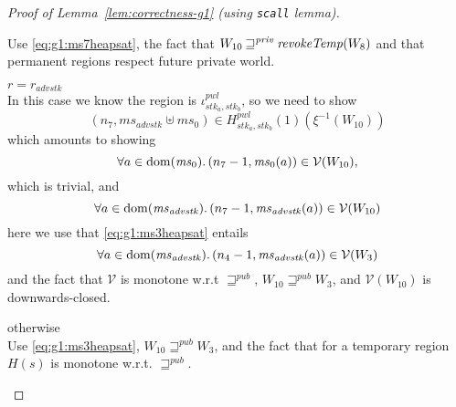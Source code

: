 \documentclass[a4paper]{article}
\DeclareMathOperator{\dom}{dom}
\newcommand{\var}[1]{\mathit{#1}}
\newcommand{\hs}{\var{ms}}
\newcommand{\ms}{\hs}
\newcommand{\adv}{\var{adv}}
\newcommand{\stk}{\var{stk}}
\newcommand{\pwl}{\var{pwl}}
\newcommand{\plainfun}[2]{
  \ifthenelse{\equal{#2}{}}
  {\mathit{#1}}
  {\mathit{#1}(#2)}
}
\newcommand{\revokeTemp}[1]{\plainfun{revokeTemp}{#1}}
\newcommand{\futurewk}{\mathbin{\sqsupseteq}^{\var{pub}}}
\newcommand{\futurestr}{\mathbin{\sqsupseteq}^{\var{priv}}}
\newcommand{\asmType}{\plaindom{AsmType}}
\newcommand{\plaindom}[1]{\mathrm{#1}}
\newcommand{\intr}[2]{\mathcal{#1}}
\newcommand{\valueintr}[1]{\intr{V}{#1}}
\newcommand{\stdvr}{\valueintr{\asmType}}
\newcommand{\npair}[2][n]{\left(#1,#2 \right)}
\begin{document}
\begin{proof}[Proof of Lemma~\ref{lem:correctness-g1} (using \texttt{scall} lemma)]
\begin{enumproof}[resume]
\begin{enumproof}
\begin{enumproof}
\begin{enumproof}
                  Use \ref{eq:g1:ms7heapsat}, the fact that $W_{10} \futurestr \revokeTemp{W_8}$ and that permanent regions respect future private world.
                \item $r = r_{\adv \stk}$ \\
                  In this case we know the region is $\iota^\pwl_{\stk_a,\stk_b}$, so we need to show
                  \[
                    \npair[n_7]{\ms_{\adv \stk} \uplus \ms_0} \in H^\pwl_{\stk_a,\stk_b}(1)(\xi^{-1}(W_{10}))
                  \]
                  which amounts to showing
                  \[
                    \forall a \in \dom(\ms_0) \ldotp  \npair[n_7-1]{\ms_0(a)} \in \stdvr(W_{10}),
                  \]
                  which is trivial, and
                  \[
                    \forall a \in \dom(\ms_{\adv \stk}) \ldotp \npair[n_7-1]{\ms_{\adv \stk}(a)} \in \stdvr(W_{10})
                  \]
                  here we use that \ref{eq:g1:ms3heapsat} entails
                  \[
                    \forall a \in \dom(\ms_{\adv \stk}) \ldotp \npair[n_4-1]{\ms_{\adv \stk}(a)} \in \stdvr(W_3)
                  \]
                  and the fact that $\stdvr$ is monotone w.r.t $\futurewk$, $W_{10} \futurewk W_3$, and $\stdvr(W_{10})$ is downwards-closed.
                \item otherwise \\
                  Use \ref{eq:g1:ms3heapsat}, $W_{10} \futurewk W_3$, and the fact that for a temporary region $H(s)$ is monotone w.r.t. $\futurewk$.
              \end{enumproof}
              

\end{enumproof}
\end{enumproof}
\end{enumproof}
\end{proof}
\end{document}
